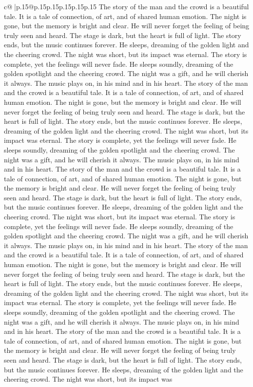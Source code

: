 \documentclass{article}
\begin{document}
{\begin{supertabular}{c@{$\;$}|p{.15\linewidth}@{}p{.15\linewidth}p{.15\linewidth}p{.15\linewidth}p{.15\linewidth}p{.15\linewidth}}
{{{The story of the man and the crowd is a beautiful tale. It is a tale of connection, of art, and of shared human emotion. The night is gone, but the memory is bright and clear. He will never forget the feeling of being truly seen and heard. The stage is dark, but the heart is full of light. The story ends, but the music continues forever. He sleeps, dreaming of the golden light and the cheering crowd. The night was short, but its impact was eternal. The story is complete, yet the feelings will never fade. He sleeps soundly, dreaming of the golden spotlight and the cheering crowd. The night was a gift, and he will cherish it always. The music plays on, in his mind and in his heart. The story of the man and the crowd is a beautiful tale. It is a tale of connection, of art, and of shared human emotion. The night is gone, but the memory is bright and clear. He will never forget the feeling of being truly seen and heard. The stage is dark, but the heart is full of light. The story ends, but the music continues forever. He sleeps, dreaming of the golden light and the cheering crowd. The night was short, but its impact was eternal. The story is complete, yet the feelings will never fade. He sleeps soundly, dreaming of the golden spotlight and the cheering crowd. The night was a gift, and he will cherish it always. The music plays on, in his mind and in his heart. The story of the man and the crowd is a beautiful tale. It is a tale of connection, of art, and of shared human emotion. The night is gone, but the memory is bright and clear. He will never forget the feeling of being truly seen and heard. The stage is dark, but the heart is full of light. The story ends, but the music continues forever. He sleeps, dreaming of the golden light and the cheering crowd. The night was short, but its impact was eternal. The story is complete, yet the feelings will never fade. He sleeps soundly, dreaming of the golden spotlight and the cheering crowd. The night was a gift, and he will cherish it always. The music plays on, in his mind and in his heart. The story of the man and the crowd is a beautiful tale. It is a tale of connection, of art, and of shared human emotion. The night is gone, but the memory is bright and clear. He will never forget the feeling of being truly seen and heard. The stage is dark, but the heart is full of light. The story ends, but the music continues forever. He sleeps, dreaming of the golden light and the cheering crowd. The night was short, but its impact was eternal. The story is complete, yet the feelings will never fade. He sleeps soundly, dreaming of the golden spotlight and the cheering crowd. The night was a gift, and he will cherish it always. The music plays on, in his mind and in his heart. The story of the man and the crowd is a beautiful tale. It is a tale of connection, of art, and of shared human emotion. The night is gone, but the memory is bright and clear. He will never forget the feeling of being truly seen and heard. The stage is dark, but the heart is full of light. The story ends, but the music continues forever. He sleeps, dreaming of the golden light and the cheering crowd. The night was short, but its impact was }}}
\end{supertabular}}
\end{document}

